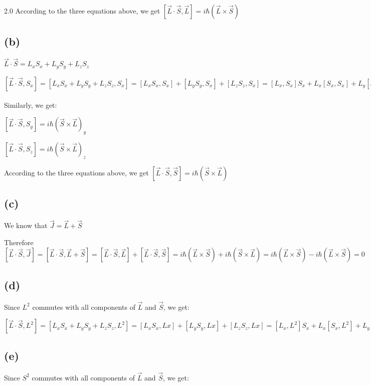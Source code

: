\documentclass[12pt]{article}
\begin{document}
\begin{spacing}{2.0}
According to the three equations above, we get $[\vec{L}\cdot\vec{S}, \vec{L}]= i\hbar(\vec{L}\times \vec{S})$

\subsection*{(b)}

$\vec{L}\cdot \vec{S}=L_xS_x+ L_yS_y+ L_zS_z$

$[\vec{L}\cdot \vec{S},S_x]= [L_xS_x+ L_yS_y+ L_zS_z, S_x]= [L_xS_x,S_x]+ [L_yS_y,S_x] + [L_zS_z,S_x] = [L_x,S_x]S_x+ L_x[S_x,S_x]+ L_y[S_y,S_x] +[L_y,S_x]S_y +[L_z,S_x]S_z +L_z[S_z,S_x]= i\hbar S_yL_z - i\hbar S_zL_y = i\hbar(\vec{S}\times \vec{L})_x$

Similarly, we get:

$[\vec{L}\cdot \vec{S},S_y]= i\hbar(\vec{S}\times \vec{L})_y$

$[\vec{L}\cdot \vec{S},S_z]= i\hbar(\vec{S}\times \vec{L})_z$

According to the three equations above, we get $[\vec{L}\cdot\vec{S}, \vec{S}]= i\hbar(\vec{S}\times \vec{L})$

\subsection*{(c)}

We know that $\vec{J}=\vec{L}+\vec{S}$

Therefore $[\vec{L}\cdot \vec{S},\vec{J}]= [\vec{L}\cdot \vec{S},\vec{L}+ \vec{S}]= [\vec{L}\cdot\vec{S}, \vec{L}] +[\vec{L}\cdot\vec{S}, \vec{S}]= i\hbar(\vec{L}\times \vec{S})+ i\hbar(\vec{S}\times \vec{L}) = i\hbar(\vec{L}\times \vec{S})- i\hbar(\vec{L}\times \vec{S})= 0$

\subsection*{(d)}

Since $L^2$ commutes with all components of $\vec{L}$ and $\vec{S}$, we get: 

$[\vec{L}\cdot \vec{S},L^2]= [L_xS_x+ L_yS_y+ L_zS_z, L^2]= [L_xS_x,Lx]+ [L_yS_y,Lx] + [L_zS_z,Lx] = [L_x,L^2]S_x+ L_x[S_x,L^2]+ L_y[S_y,L^2] +S_y[L_y,L^2] +[L_z,L^2]S_z +L_z[S_z,L^2]= 0$

\subsection*{(e)}

Since $S^2$ commutes with all components of $\vec{L}$ and $\vec{S}$, we get:


\end{spacing}
\end{document}
